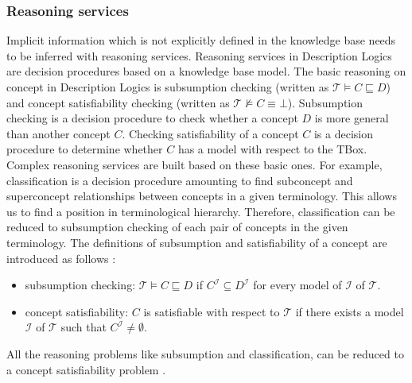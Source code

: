 \documentclass{article}
\begin{document}
\subsubsection{Reasoning services}
Implicit information which is not explicitly defined in the knowledge base needs to be inferred with reasoning services.
Reasoning services in Description Logics are decision procedures based on a knowledge base model. 
The basic reasoning on concept in Description Logics is subsumption checking (written as $\mathcal{T}\vDash C\sqsubseteq D$) and 
concept satisfiability checking (written as $\mathcal{T}\nvDash C\equiv \bot$).
Subsumption checking is a decision procedure to check whether a concept $D$ is more general than another concept $C$.
Checking satisfiability of a concept $C$ is a decision procedure to determine whether $C$ has a model with respect to the TBox.
Complex reasoning services are built based on these basic ones. For example, classification is a decision procedure amounting to find subconcept and superconcept 
relationships between concepts in a given terminology. This allows us to find a position in terminological hierarchy.
Therefore, classification can be reduced to subsumption checking of each pair of concepts in the given terminology.
The definitions of subsumption and satisfiability of a concept are introduced as follows \cite{baader2003description}:
\begin{itemize}
\item subsumption checking: $\mathcal{T}\vDash C\sqsubseteq D$ if $C^\mathcal{I}\subseteq D^\mathcal{I}$ for every model of $\mathcal{I}$ of $\mathcal{T}$.
\item concept satisfiability: $C$ is satisfiable with respect to $\mathcal{T}$ if there exists a model $\mathcal{I}$ of $\mathcal{T}$ such that $C^\mathcal{I}\neq \emptyset$.
\end{itemize}
All the reasoning problems like subsumption and classification, can be reduced to a concept satisfiability problem \cite{baader2003description}.
\end{document}
